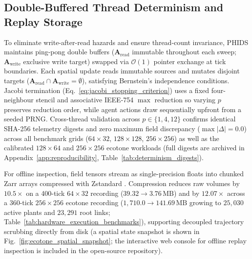 \subsection{Double-Buffered Thread Determinism and Replay Storage}
\label{subsec:double_buffering_zarr}

To eliminate write-after-read hazards and ensure thread-count invariance, PHIDS maintains ping-pong double buffers ($\mathbf{A}_{\mathrm{read}}$ immutable throughout each sweep; $\mathbf{A}_{\mathrm{write}}$ exclusive write target) swapped via $\mathcal{O}(1)$ pointer exchange at tick boundaries. Each spatial update reads immutable sources and mutates disjoint targets ($\mathbf{A}_{\mathrm{read}} \cap \mathbf{A}_{\mathrm{write}} = \emptyset$), satisfying Bernstein's independence conditions. Jacobi termination (Eq.~\eqref{eq:jacobi_stopping_criterion}) uses a fixed four-neighbour stencil and associative IEEE-754 $\max$ reduction so varying $p$ preserves reduction order, while agent actions draw sequentially upfront from a seeded PRNG. Cross-thread validation across $p \in \{1, 4, 12\}$ confirms identical SHA-256 telemetry digests and zero maximum field discrepancy ($\max|\Delta| = 0.0$) across all benchmark grids ($64 \times 32$, $128 \times 128$, $256 \times 256$) as well as the calibrated $128 \times 64$ and $256 \times 256$ ecotone workloads (full digests are archived in Appendix~\ref{app:reproducibility}, Table~\ref{tab:determinism_digests}).

For offline inspection, field tensors stream as single-precision floats into chunked Zarr arrays \cite{miles2020zarr} compressed with Zstandard \cite{collet2021zstd}. Compression reduces raw volumes by $10.5\times$ on a 400-tick $64 \times 32$ recording ($39.32 \to 3.76\,\text{MB}$) and by $12.07\times$ across a 360-tick $256 \times 256$ ecotone recording ($1{,}710.0 \to 141.69\,\text{MB}$ growing to $25{,}030$ active plants and $23{,}291$ root links; Table~\ref{tab:hardware_execution_benchmarks}), supporting decoupled trajectory scrubbing directly from disk (a spatial state snapshot is shown in Fig.~\ref{fig:ecotone_spatial_snapshot}; the interactive web console for offline replay inspection is included in the open-source repository).
